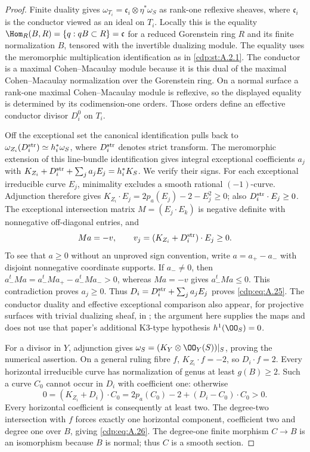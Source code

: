 \begin{proof}
Finite duality gives $\omega_{T_i}=\mathfrak c_i\otimes\eta^*\omega_S$ as rank-one reflexive sheaves, where $\mathfrak c_i$ is the conductor viewed as an ideal on $T_i$. Locally this is the equality
$\Hom_R(B,R)=\{q:qB\subset R\}=\mathfrak c$ for a reduced Gorenstein ring $R$ and its finite normalization $B$, tensored with the invertible dualizing module. The equality uses the meromorphic multiplication identification as in \ref{cdp:st:A.2.1}. The conductor is a maximal Cohen--Macaulay module because it is this dual of the maximal Cohen--Macaulay normalization over the Gorenstein ring. On a normal surface a rank-one maximal Cohen--Macaulay module is reflexive, so the displayed equality is determined by its codimension-one orders. Those orders define an effective conductor divisor $D_i^0$ on $T_i$.

Off the exceptional set the canonical identification pulls back to $\omega_{Z_i}(D_i^{\rm str})\simeq h_i^*\omega_S$, where $D_i^{\rm str}$ denotes strict transform. The meromorphic extension of this line-bundle identification gives integral exceptional coefficients $a_j$ with
$K_{Z_i}+D_i^{\rm str}+\sum_j a_jE_j=h_i^*K_S$.
We verify their signs. For each exceptional irreducible curve $E_j$, minimality excludes a smooth rational $(-1)$-curve. Adjunction therefore gives
$K_{Z_i}\cdot E_j=2p_a(E_j)-2-E_j^2\ge0$;
also $D_i^{\rm str}\cdot E_j\ge0$. The exceptional intersection matrix $M=(E_j\cdot E_k)$ is negative definite with nonnegative off-diagonal entries, and
\[
 M a=-v,\qquad v_j=(K_{Z_i}+D_i^{\rm str})\cdot E_j\ge0.
\]
To see that $a\ge0$ without an unproved sign convention, write $a=a_+-a_-$ with disjoint nonnegative coordinate supports. If $a_-\ne0$, then
$a_-^tMa=a_-^tMa_+-a_-^tMa_->0$,
whereas $Ma=-v$ gives $a_-^tMa\le0$. This contradiction proves $a_j\ge0$. Thus $D_i=D_i^{\rm str}+\sum_j a_jE_j$ proves \eqref{cdp:eq:A.25}. The conductor duality and effective exceptional comparison also appear, for projective surfaces with trivial dualizing sheaf, in \cite[Lemma~1.1 and Corollary~1.4]{Furushima1993}; the argument here supplies the maps and does not use that paper's additional K3-type hypothesis $h^1(\OO_S)=0$.

For a divisor in $Y$, adjunction gives $\omega_S=(K_Y\otimes\OO_Y(S))|_S$, proving the numerical assertion. On a general ruling fibre $f$, $K_{Z_i}\cdot f=-2$, so $D_i\cdot f=2$. Every horizontal irreducible curve has normalization of genus at least $g(B)\ge2$. Such a curve $C_0$ cannot occur in $D_i$ with coefficient one: otherwise
\[
 0=(K_{Z_i}+D_i)\cdot C_0
   =2p_a(C_0)-2+(D_i-C_0)\cdot C_0>0.
\]
Every horizontal coefficient is consequently at least two. The degree-two intersection with $f$ forces exactly one horizontal component, coefficient two and degree one over $B$, giving \eqref{cdp:eq:A.26}. The degree-one finite morphism $C\to B$ is an isomorphism because $B$ is normal; thus $C$ is a smooth section.


\end{proof}
